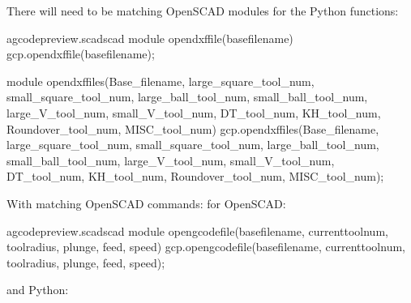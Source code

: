 \documentclass{ltxdoc}
\begin{document}
%
There will need to be matching OpenSCAD modules for the Python functions:

\lstset{firstnumber=\thegcpscad}
\begin{writecode}{a}{gcodepreview.scad}{scad}
module opendxffile(basefilename){
    gcp.opendxffile(basefilename);
}

module opendxffiles(Base_filename, large_square_tool_num, small_square_tool_num, large_ball_tool_num, small_ball_tool_num, large_V_tool_num, small_V_tool_num, DT_tool_num, KH_tool_num, Roundover_tool_num, MISC_tool_num) {
    gcp.opendxffiles(Base_filename, large_square_tool_num, small_square_tool_num, large_ball_tool_num, small_ball_tool_num, large_V_tool_num, small_V_tool_num, DT_tool_num, KH_tool_num, Roundover_tool_num, MISC_tool_num);
}

\end{writecode}
\addtocounter{gcpscad}{8}

With matching OpenSCAD commands:  for OpenSCAD:

 
\lstset{firstnumber=\thegcpscad}
\begin{writecode}{a}{gcodepreview.scad}{scad}
module opengcodefile(basefilename, currenttoolnum, toolradius, plunge, feed, speed) {
    gcp.opengcodefile(basefilename, currenttoolnum, toolradius, plunge, feed, speed);
}

\end{writecode}
\addtocounter{gcpscad}{4}

\noindent and Python:
\end{document}
